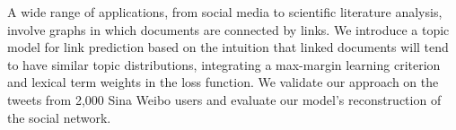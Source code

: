 A wide range of applications, from social media to scientific literature analysis, involve graphs in which documents are connected by links. We introduce a topic model for link prediction based on the intuition that linked documents will tend to have similar topic distributions, integrating a max-margin learning criterion and lexical term weights in the loss function. We validate our approach on the tweets from 2,000 Sina Weibo users and evaluate our model's reconstruction of the social network.
